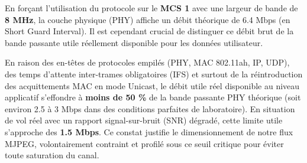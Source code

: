 En forçant l'utilisation du protocole sur le \textbf{MCS 1} avec une largeur de bande de \textbf{8 MHz}, la couche physique (PHY) 
affiche un débit théorique de 6.4 Mbps (en Short Guard Interval). Il est cependant crucial de distinguer ce débit 
brut de la bande passante utile réellement disponible pour les données utilisateur. 

En raison des en-têtes de protocoles empilés (PHY, MAC 802.11ah, IP, UDP), des temps d'attente inter-trames obligatoires (IFS) et 
surtout de la réintroduction des acquittements MAC en mode Unicast, le débit utile réel disponible au niveau applicatif s'effondre 
à \textbf{moins de 50 \%} de la bande passante PHY théorique (soit environ 2.5 à 3 Mbps dans des conditions parfaites de laboratoire). En 
situation de vol réel avec un rapport signal-sur-bruit (SNR) dégradé, cette limite utile s'approche des \textbf{1.5 Mbps}. Ce constat 
justifie le dimensionnement de notre flux MJPEG, volontairement contraint et profilé sous ce seuil critique pour éviter 
toute saturation du canal.